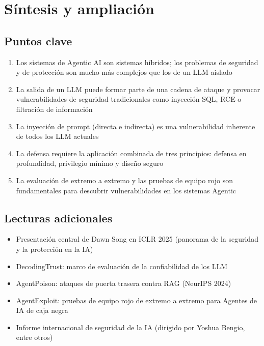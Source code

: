 \section{Síntesis y ampliación}

\subsection{Puntos clave}

\begin{enumerate}
    \item Los sistemas de Agentic AI son sistemas híbridos; los problemas de seguridad y de protección son mucho más complejos que los de un LLM aislado
    \item La salida de un LLM puede formar parte de una cadena de ataque y provocar vulnerabilidades de seguridad tradicionales como inyección SQL, RCE o filtración de información
    \item La inyección de prompt (directa e indirecta) es una vulnerabilidad inherente de todos los LLM actuales
    \item La defensa requiere la aplicación combinada de tres principios: defensa en profundidad, privilegio mínimo y diseño seguro
    \item La evaluación de extremo a extremo y las pruebas de equipo rojo son fundamentales para descubrir vulnerabilidades en los sistemas Agentic
\end{enumerate}

\subsection{Lecturas adicionales}
\begin{itemize}
    \item Presentación central de Dawn Song en ICLR 2025 (panorama de la seguridad y la protección en la IA)
    \item DecodingTrust: marco de evaluación de la confiabilidad de los LLM
    \item AgentPoison: ataques de puerta trasera contra RAG (NeurIPS 2024)
    \item AgentExploit: pruebas de equipo rojo de extremo a extremo para Agentes de IA de caja negra
    \item Informe internacional de seguridad de la IA (dirigido por Yoshua Bengio, entre otros)
\end{itemize}




